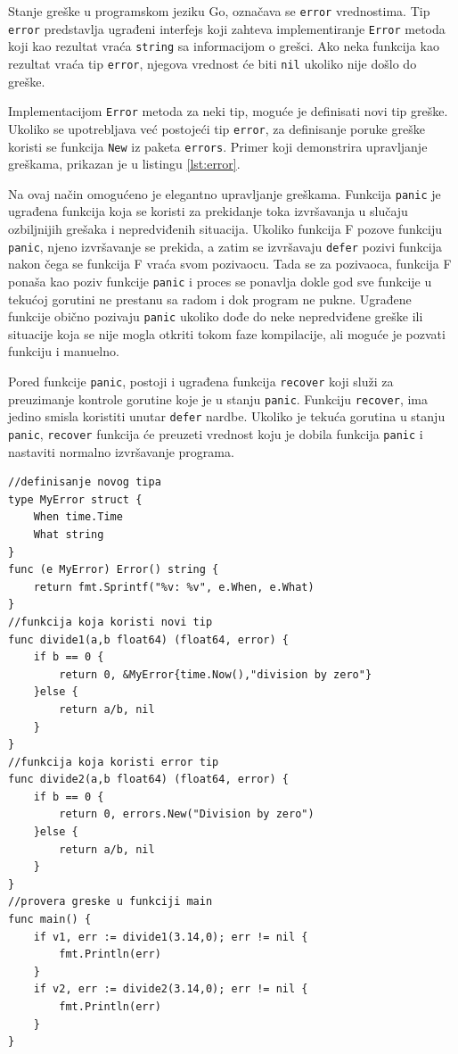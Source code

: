 \documentclass[12pt,oneside]{memoir}
\begin{document}
Stanje greške u programskom jeziku Go, označava se \texttt{error} vrednostima. Tip \texttt{error} predstavlja ugrađeni interfejs koji zahteva implementiranje \texttt{Error} metoda koji kao rezultat vraća \texttt{string} sa informacijom o grešci. Ako neka funkcija kao rezultat vraća tip \texttt{error}, njegova vrednost će biti \texttt{nil} ukoliko nije došlo do greške. 

Implementacijom \texttt{Error} metoda za neki tip, moguće je definisati novi tip greške. Ukoliko se upotrebljava već postojeći tip \texttt{error}, za definisanje poruke greške koristi se funkcija \texttt{New} iz paketa \texttt{errors}. Primer koji demonstrira upravljanje greškama, prikazan je u listingu \ref{lst:error}.

Na ovaj način omogućeno je elegantno upravljanje greškama. Funkcija \texttt{panic} je ugrađena funkcija koja se koristi za prekidanje toka izvršavanja u slučaju ozbiljnijih grešaka i nepredviđenih situacija. Ukoliko funkcija F pozove funkciju \texttt{panic}, njeno izvršavanje se prekida, a zatim se izvršavaju \texttt{defer} pozivi funkcija nakon čega se funkcija F vraća svom pozivaocu. Tada se za pozivaoca, funkcija F ponaša kao poziv funkcije \texttt{panic} i proces se ponavlja dokle god sve funkcije u tekućoj gorutini ne prestanu sa radom i dok program ne pukne. Ugrađene funkcije obično pozivaju \texttt{panic} ukoliko dođe do neke nepredviđene greške ili situacije koja se nije mogla otkriti tokom faze kompilacije, ali moguće je pozvati funkciju i manuelno. 

Pored funkcije \texttt{panic}, postoji i ugrađena funkcija \texttt{recover} koji služi za preuzimanje kontrole gorutine koje je u stanju \texttt{panic}. Funkciju \texttt{recover}, ima jedino smisla koristiti unutar \texttt{defer} nardbe. Ukoliko je tekuća gorutina u stanju \texttt{panic}, \texttt{recover} funkcija će preuzeti vrednost koju je dobila funkcija \texttt{panic} i nastaviti normalno izvršavanje programa.

\begin{center}
\begin{lstlisting}[caption=Primer koji demonstrira upravljanje greškama, label={lst:error},  backgroundcolor=\color{background}]
//definisanje novog tipa
type MyError struct {
	When time.Time
	What string
}
func (e MyError) Error() string {
	return fmt.Sprintf("%v: %v", e.When, e.What)
}
//funkcija koja koristi novi tip
func divide1(a,b float64) (float64, error) {
	if b == 0 {
		return 0, &MyError{time.Now(),"division by zero"}
	}else {
		return a/b, nil
	}
}
//funkcija koja koristi error tip
func divide2(a,b float64) (float64, error) {
	if b == 0 {
		return 0, errors.New("Division by zero")
	}else {
		return a/b, nil
	}
}
//provera greske u funkciji main
func main() {
	if v1, err := divide1(3.14,0); err != nil {
		fmt.Println(err)				
	}
	if v2, err := divide2(3.14,0); err != nil {
		fmt.Println(err)			
	}
}
\end{lstlisting}
\end{center}
 
\end{document}
